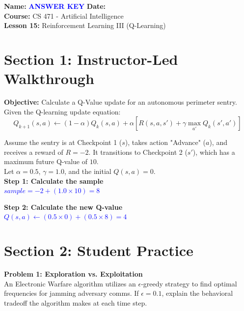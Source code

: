 \documentclass[12pt]{article}
\begin{document}
\noindent
\textbf{Name:} \textbf{\textcolor{blue}{ANSWER KEY}} \hfill \textbf{Date:} \underline{\hspace{4cm}} \\
\textbf{Course:} CS 471 - Artificial Intelligence \\
\textbf{Lesson 15:} Reinforcement Learning III (Q-Learning)

\vspace{1cm}

\section*{Section 1: Instructor-Led Walkthrough}
\textbf{Objective:} Calculate a Q-Value update for an autonomous perimeter sentry. \\

Given the Q-learning update equation:
\[ Q_{k+1}(s,a) \leftarrow (1-\alpha)Q_k(s,a) + \alpha \left[ R(s,a,s') + \gamma \max_{a'} Q_k(s',a') \right] \]

\noindent
Assume the sentry is at Checkpoint 1 ($s$), takes action "Advance" ($a$), and receives a reward of $R = -2$. It transitions to Checkpoint 2 ($s'$), which has a maximum future Q-value of $10$. \\
Let $\alpha = 0.5$, $\gamma = 1.0$, and the initial $Q(s,a) = 0$. \\

\noindent
\textbf{Step 1: Calculate the sample} \\
\textbf{\textcolor{blue}{$sample = -2 + (1.0 \times 10) = 8$}}

\vspace{2cm}

\noindent
\textbf{Step 2: Calculate the new Q-value} \\
\textbf{\textcolor{blue}{$Q(s,a) \leftarrow (0.5 \times 0) + (0.5 \times 8) = 4$}}

\vspace{2cm}

\section*{Section 2: Student Practice}

\textbf{Problem 1: Exploration vs. Exploitation} \\
An Electronic Warfare algorithm utilizes an $\epsilon$-greedy strategy to find optimal frequencies for jamming adversary comms. If $\epsilon = 0.1$, explain the behavioral tradeoff the algorithm makes at each time step.
\end{document}
